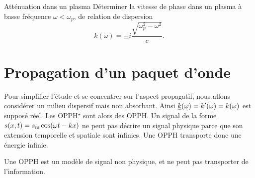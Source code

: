 \documentclass[12pt,fancy]{cours}%
\begin{document}
\begin{exemple}{Atténuation dans un plasma}
  Déterminer la vitesse de phase dans un plasma à basse fréquence $\omega < \omega_p$, de relation de dispersion
  \begin{equation}
    k(\omega) = \pm i\frac{\sqrt{\omega_p^2-\omega^2}}{c}.
  \end{equation}
\end{exemple}


\section{Propagation d'un paquet d'onde}
Pour simplifier l'étude et se concentrer sur l'aspect propagatif, nous allons considérer un milieu dispersif mais non absorbant. Ainsi $\underline{k}(\omega) = k'(\omega) = k(\omega)$ est supposé réel. Les OPPH$^{\star}$ sont alors des OPPH.
Un signal de la forme $s(x,t)=s_{\rm{m}}\cos(\omega t-kx)$ ne peut pas décrire un signal physique parce que son extension temporelle et spatiale sont infinies. Une OPPH transporte donc une énergie infinie.
\begin{prop}\label{prop:}
  Une OPPH est un modèle de signal non physique, et ne peut pas  transporter de l'information.
\end{prop}
\end{document}

